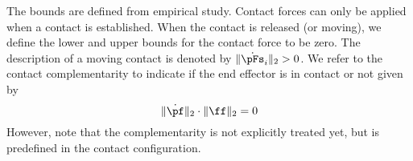 %
The bounds are defined from empirical study.
Contact forces can only be applied when a contact is established.
When the contact is released (or moving), we define the lower and upper bounds for the contact force to be zero.
The description of a moving contact is denoted by $\lVert \dot{\pFs}_i \rVert_2 > 0$.
We refer to the contact complementarity to indicate if the end effector is in contact or not given by
\begin{equation}
  \label{eq:contact_complementarity}
  \lVert \dot{\pf} \rVert_2 \cdot \lVert \ff \rVert_2 = 0
\end{equation}
However, note that the complementarity is not explicitly treated yet, but is predefined in the contact configuration.

